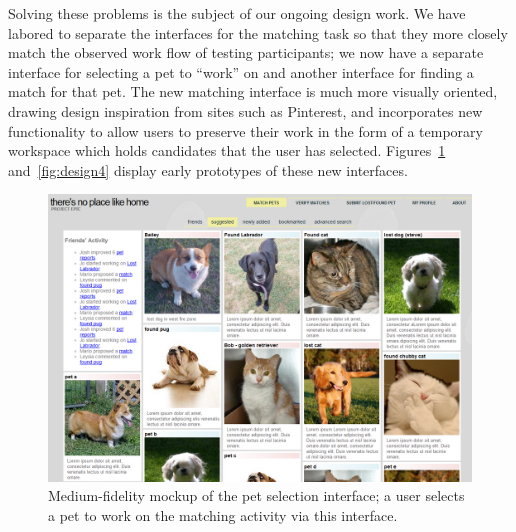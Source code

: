 Solving these problems is the subject of our ongoing design work.  We have labored to separate the interfaces for the matching task so that they more closely match the observed work flow of testing participants; we now have a separate interface for selecting a pet to ``work'' on and another interface for finding a match for that pet.  The new matching interface is much more visually oriented, drawing design inspiration from sites such as Pinterest, and incorporates new functionality to allow users to preserve their work in the form of a temporary workspace which holds candidates that the user has selected.  Figures~\ref{fig:design3} and~\ref{fig:design4} display early prototypes of these new interfaces.

\begin{figure}[htbp]
    \begin{center}
	\includegraphics[width=150mm]{figs/design3.png}
    \end{center}
        \caption[Third Interface Prototype: selecting a pet to work on]{
        Medium-fidelity mockup of the pet selection interface; a user selects a pet to work on the matching activity via this interface.
	}
	 \label{fig:design3}
\end{figure}

